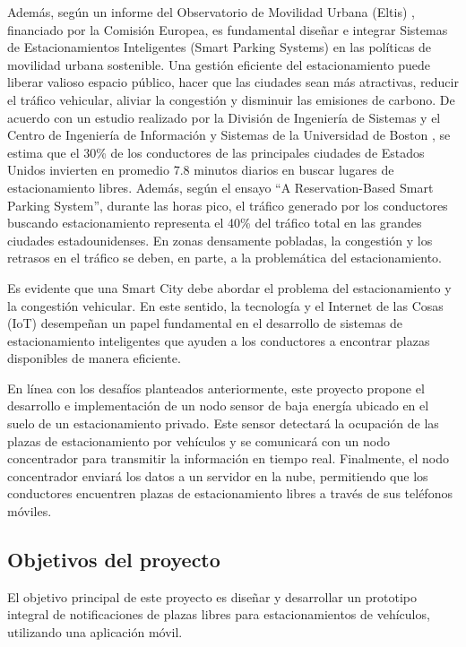 Además, según un informe del Observatorio de Movilidad Urbana (Eltis) \cite{ref2}, financiado por la Comisión Europea, es fundamental diseñar e integrar Sistemas de Estacionamientos Inteligentes (Smart Parking Systems) en las políticas de movilidad urbana sostenible. Una gestión eficiente del estacionamiento puede liberar valioso espacio público, hacer que las ciudades sean más atractivas, reducir el tráfico vehicular, aliviar la congestión y disminuir las emisiones de carbono. De acuerdo con un estudio realizado por la División de Ingeniería de Sistemas y el Centro de Ingeniería de Información y Sistemas de la Universidad de Boston \cite{ref3}, se estima que el 30\% de los conductores de las principales ciudades de Estados Unidos invierten en promedio 7.8 minutos diarios en buscar lugares de estacionamiento libres. Además, según el ensayo ``A Reservation-Based Smart Parking System''\cite{ref4}, durante las horas pico, el tráfico generado por los conductores buscando estacionamiento representa el 40\% del tráfico total en las grandes ciudades estadounidenses. En zonas densamente pobladas, la congestión y los retrasos en el tráfico se deben, en parte, a la problemática del estacionamiento.

Es evidente que una Smart City debe abordar el problema del estacionamiento y la congestión vehicular. En este sentido, la tecnología y el Internet de las Cosas (IoT) desempeñan un papel fundamental en el desarrollo de sistemas de estacionamiento inteligentes que ayuden a los conductores a encontrar plazas disponibles de manera eficiente.

En línea con los desafíos planteados anteriormente, este proyecto propone el desarrollo e implementación de un nodo sensor de baja energía ubicado en el suelo de un estacionamiento privado. Este sensor detectará la ocupación de las plazas de estacionamiento por vehículos y se comunicará con un nodo concentrador para transmitir la información en tiempo real. Finalmente, el nodo concentrador enviará los datos a un servidor en la nube, permitiendo que los conductores encuentren plazas de estacionamiento libres a través de sus teléfonos móviles.

\subsection{Objetivos del proyecto}
El objetivo principal de este proyecto es diseñar y desarrollar un prototipo integral de notificaciones de plazas libres para estacionamientos de vehículos, utilizando una aplicación móvil.

